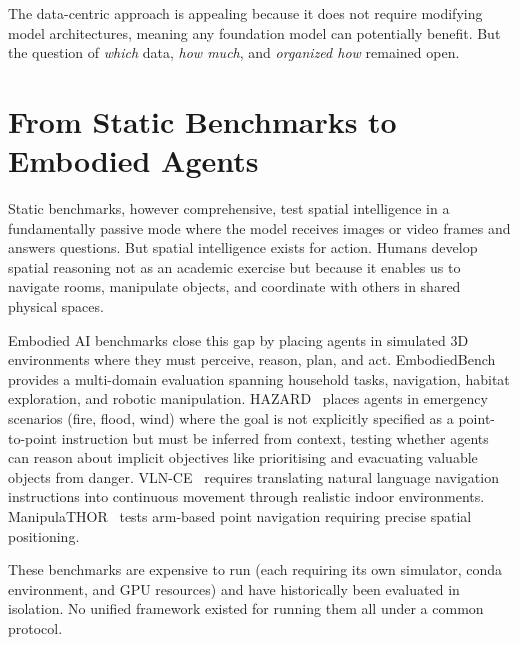 The data-centric approach is appealing because it does not require modifying model architectures, meaning any foundation model can potentially benefit. But the question of \textit{which} data, \textit{how much}, and \textit{organized how} remained open.

\section{From Static Benchmarks to Embodied Agents}

Static benchmarks, however comprehensive, test spatial intelligence in a fundamentally passive mode where the model receives images or video frames and answers questions. But spatial intelligence exists for action. Humans develop spatial reasoning not as an academic exercise but because it enables us to navigate rooms, manipulate objects, and coordinate with others in shared physical spaces.

Embodied AI benchmarks close this gap by placing agents in simulated 3D environments where they must perceive, reason, plan, and act. EmbodiedBench~\cite{yang2025embodiedbenchcomprehensivebenchmarkingmultimodal} provides a multi-domain evaluation spanning household tasks, navigation, habitat exploration, and robotic manipulation. HAZARD~\cite{zhou2024hazardchallengeembodieddecision} places agents in emergency scenarios (fire, flood, wind) where the goal is not explicitly specified as a point-to-point instruction but must be inferred from context, testing whether agents can reason about implicit objectives like prioritising and evacuating valuable objects from danger. VLN-CE~\cite{krantz2020navgraphvisionandlanguagenavigationcontinuous} requires translating natural language navigation instructions into continuous movement through realistic indoor environments. ManipulaTHOR~\cite{ehsani2021manipulathorframeworkvisualobject} tests arm-based point navigation requiring precise spatial positioning.

These benchmarks are expensive to run (each requiring its own simulator, conda environment, and GPU resources) and have historically been evaluated in isolation. No unified framework existed for running them all under a common protocol.
